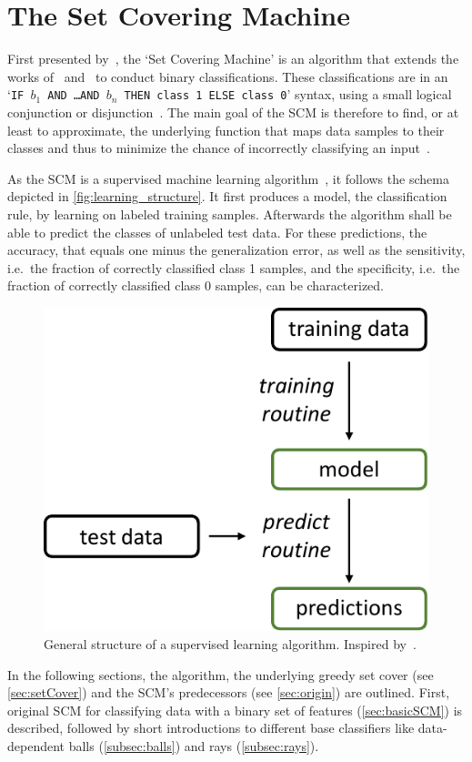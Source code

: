 \chapter{The Set Covering Machine}\label{ch:scm}

First presented by~\cite{marchand02}, the `Set Covering Machine' is an algorithm 
that extends the works of~\cite{valiant} and~\cite{haussler88} to conduct binary
classifications.
These classifications are in an `\texttt{IF \(b_1\) AND \dots AND \(b_n\) THEN class 1 ELSE class 0}'
syntax, using a small logical conjunction or disjunction~\citep{taudien}.
The main goal of the SCM is therefore to find, or at least to approximate, the underlying function that maps data samples to their classes
and thus to minimize the chance of incorrectly classifying an input~\citep{drouin16}.

As the SCM is a supervised machine learning algorithm~\citep{haussler88}, it follows the schema depicted in \autoref{fig:learning_structure}.
It first produces a model, the classification rule, by learning on labeled training samples.
Afterwards the algorithm shall be able to predict the classes of unlabeled test data.
For these predictions, the accuracy, that equals one minus the generalization error, as well as the
sensitivity, i.e.\ the fraction of correctly classified class 1 samples, and the specificity,
i.e.\ the fraction of correctly classified class 0 samples, can be characterized.

\begin{figure}[ht]
    \centering
    \includegraphics[width=0.55\columnwidth]{figures/learning_structure.pdf}
    \caption{General structure of a supervised learning algorithm. Inspired by~\cite{valiant}.}\label{fig:learning_structure}
\end{figure}

In the following sections, the algorithm, the underlying greedy set cover (see \autoref{sec:setCover}) and the SCM's predecessors (see \autoref{sec:origin}) are outlined.
First, original SCM for classifying data with a binary set of features (\autoref{sec:basicSCM}) is described, followed by short
introductions to different base classifiers like data-dependent balls (\autoref{subsec:balls}) and rays (\autoref{subsec:rays}).

